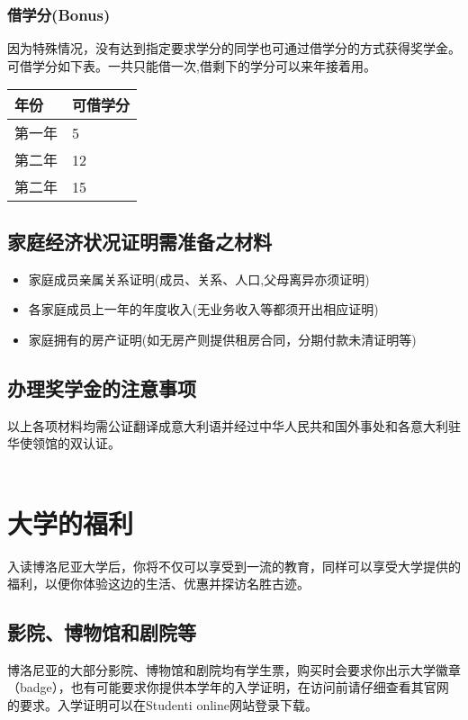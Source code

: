 \subsubsection{借学分(Bonus)}
因为特殊情况，没有达到指定要求学分的同学也可通过借学分的方式获得奖学金。可借学分如下表。一共只能借一次,借剩下的学分可以来年接着用。\\


\begin{tabularx}{\textwidth}{ |X|X| }
  \hline
  年份 & 可借学分\\
  \hline 
  第一年  & 5  \\
  第二年  & 12  \\
  第二年  & 15  \\
  \hline
\end{tabularx}

\subsection{家庭经济状况证明需准备之材料}
\begin{itemize}
 \item 家庭成员亲属关系证明(成员、关系、人口,父母离异亦须证明)
 \item 各家庭成员上一年的年度收入(无业务收入等都须开出相应证明) 
 \item 家庭拥有的房产证明(如无房产则提供租房合同，分期付款未清证明等)
\end{itemize} 

\subsection{办理奖学金的注意事项}
以上各项材料均需公证翻译成意大利语并经过中华人民共和国外事处和各意大利驻华使领馆的双认证。
\\
\\

\section{大学的福利}
入读博洛尼亚大学后，你将不仅可以享受到一流的教育，同样可以享受大学提供的福利，以便你体验这边的生活、优惠并探访名胜古迹。

\subsection{影院、博物馆和剧院等}

博洛尼亚的大部分影院、博物馆和剧院均有学生票，购买时会要求你出示大学徽章（badge），也有可能要求你提供本学年的入学证明，在访问前请仔细查看其官网的要求。入学证明可以在Studenti online网站登录下载。

